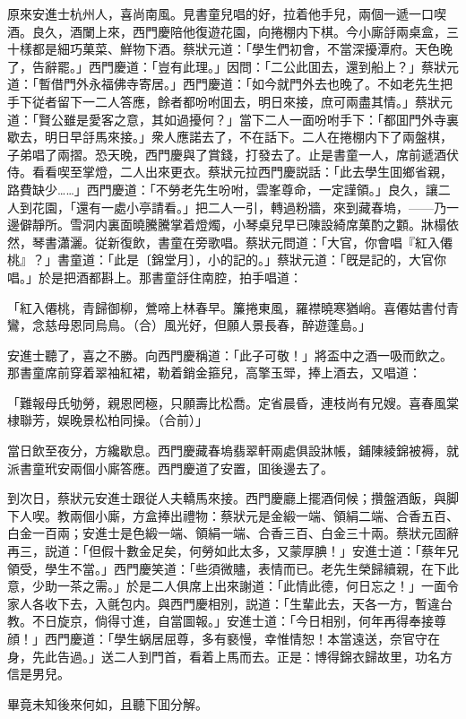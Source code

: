 原來安進士杭州人，喜尚南風。見書童兒唱的好，拉着他手兒，兩個一遞一口喫酒。良久，酒闌上來，西門慶陪他復遊花園，向捲棚内下棋。今小廝㧱兩桌盒，三十樣都是細巧菓菜、鮮物下酒。蔡狀元道：「學生們初會，不當深擾潭府。天色晚了，告辭罷。」西門慶道：「豈有此理。」因問：「二公此囬去，還到船上？」蔡狀元道：「暫借門外永福佛寺寄居。」西門慶道：「如今就門外去也晚了。不如老先生把手下従者留下一二人答應，餘者都吩咐囬去，明日來接，庶可兩盡其情。」蔡狀元道：「賢公雖是愛客之意，其如過擾何？」當下二人一面吩咐手下：「都囬門外寺裏歇去，明日早㧱馬來接。」衆人應諾去了，不在話下。二人在捲棚内下了兩盤棋，子弟唱了兩摺。恐天晚，西門慶與了賞錢，打發去了。止是書童一人，席前遞酒伏侍。看看喫至掌燈，二人出來更衣。蔡狀元拉西門慶説話：「此去學生囬鄉省親，路費缺少……」西門慶道：「不勞老先生吩咐，雲峯尊命，一定謹領。」良久，讓二人到花園，「還有一處小亭請看。」把二人一引，轉過粉牆，來到藏春塢，——乃一邊僻靜所。雪洞内裏面曉騰騰掌着燈燭，小琴桌兒早已陳設綺席菓酌之䫫。牀榻依然，琴書瀟灑。従新復飲，書童在旁歌唱。蔡狀元問道：「大官，你會唱『紅入僊桃』？」書童道：「此是〔錦堂月〕，小的記的。」蔡狀元道：「旣是記的，大官你唱。」於是把酒都斟上。那書童㧱住南腔，拍手唱道：

\begin{myquote}
「紅入僊桃，青歸御柳，鶯啼上林春早。簾捲東風，羅襟曉寒猶峭。喜僊姑書付青鸞，念慈母恩同烏鳥。{\marktext\small（合）}風光好，但願人景長春，醉遊蓬島。」
\end{myquote}

安進士聽了，喜之不勝。向西門慶稱道：「此子可敬！」將盃中之酒一吸而飲之。那書童席前穿着翠袖紅裙，勒着銷金箍兒，高擎玉斝，捧上酒去，又唱道：

\begin{myquote}
「難報母氏劬勞，親恩罔極，只願壽比松喬。定省晨昏，連枝尚有兄嫂。喜春風棠棣聯芳，娱晚景松柏同操。{\marktext\small（合前）}」
\end{myquote}

當日飲至夜分，方纔歇息。西門慶藏春塢翡翠軒兩處俱設牀帳，鋪陳綾錦被褥，就派書童玳安兩個小廝答應。西門慶道了安置，囬後邊去了。

到次日，蔡狀元安進士跟従人夫轎馬來接。西門慶廳上擺酒伺候；攢盤酒飯，與脚下人喫。教兩個小廝，方盒捧出禮物：蔡狀元是金緞一端、領絹二端、合香五百、白金一百兩；安進士是色緞一端、領絹一端、合香三百、白金三十兩。蔡狀元固辭再三，説道：「但假十數金足矣，何勞如此太多，又蒙厚腆！」安進士道：「蔡年兄領受，學生不當。」西門慶笑道：「些須微贐，表情而已。老先生榮歸續親，在下此意，少助一茶之需。」於是二人俱席上出來謝道：「此情此德，何日忘之！」一面令家人各收下去，入氈包内。與西門慶相別，説道：「生輩此去，天各一方，暫違台教。不日旋京，倘得寸進，自當圖報。」安進士道：「今日相别，何年再得奉接尊顔！」西門慶道：「學生蜗居屈尊，多有褻慢，幸惟情恕！本當遠送，奈官守在身，先此告過。」送二人到門首，看着上馬而去。正是：博得錦衣歸故里，功名方信是男兒。

畢竟未知後來何如，且聽下囬分解。

